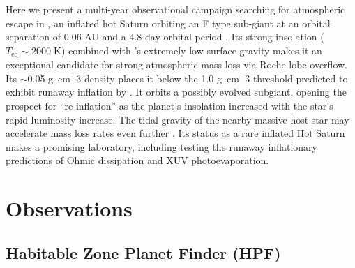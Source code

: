 \documentclass[twocolumn]{aastex631}
\begin{document}
Here we present a multi-year observational campaign searching for atmospheric escape in , an inflated hot Saturn orbiting an F type sub-giant at an orbital separation of 0.06 AU and a 4.8-day orbital period \citep{2017AJ....153..211Z}.  Its strong insolation ($T_\mathrm{eq}\sim2000\;$K) combined with 's extremely low surface gravity makes it an exceptional candidate for strong atmospheric mass loss via Roche lobe overflow.  Its $\sim$0.05 g~cm$^-3$ density places it below the 1.0 g~cm$^-3$ threshold predicted to exhibit runaway inflation by \citet{2023ApJ...945L..36T}.  It orbits a possibly evolved subgiant, opening the prospect for ``re-inflation'' \citep{2022AJ....163...53S,2022AJ....163..120G,2023arXiv230306728G} as the planet's insolation increased with the star's rapid luminosity increase.  The tidal gravity of the nearby massive host star may accelerate mass loss rates even further \citep{2007A&A...472..329E,2023ApJ...945L..36T}. Its status as a rare inflated Hot Saturn makes  a promising laboratory, including testing the runaway inflationary predictions of Ohmic dissipation and XUV photoevaporation.

\section{Observations}
\subsection{Habitable Zone Planet Finder (HPF)}
\end{document}
